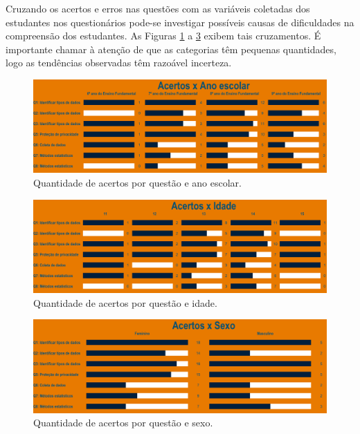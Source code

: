 \documentclass[
]{book}
\begin{document}
Cruzando os acertos e erros nas questões com as variáveis coletadas dos estudantes nos questionários pode-se investigar possíveis causas de dificuldades na compreensão dos estudantes. As Figuras \ref{fig:impacto21} a \ref{fig:impacto23} exibem tais cruzamentos. É importante chamar à atenção de que as categorias têm pequenas quantidades, logo as tendências observadas têm razoável incerteza.

\begin{figure}

{\centering \includegraphics[width=0.75\linewidth,height=0.75\textheight]{images/Impactos/21} 

}

\caption{Quantidade de acertos por questão e ano escolar.}\label{fig:impacto21}
\end{figure}

\begin{figure}

{\centering \includegraphics[width=0.75\linewidth,height=0.75\textheight]{images/Impactos/22} 

}

\caption{Quantidade de acertos por questão e idade.}\label{fig:impacto22}
\end{figure}

\begin{figure}

{\centering \includegraphics[width=0.75\linewidth,height=0.75\textheight]{images/Impactos/23} 

}

\caption{Quantidade de acertos por questão e sexo.}\label{fig:impacto23}
\end{figure}
\end{document}

